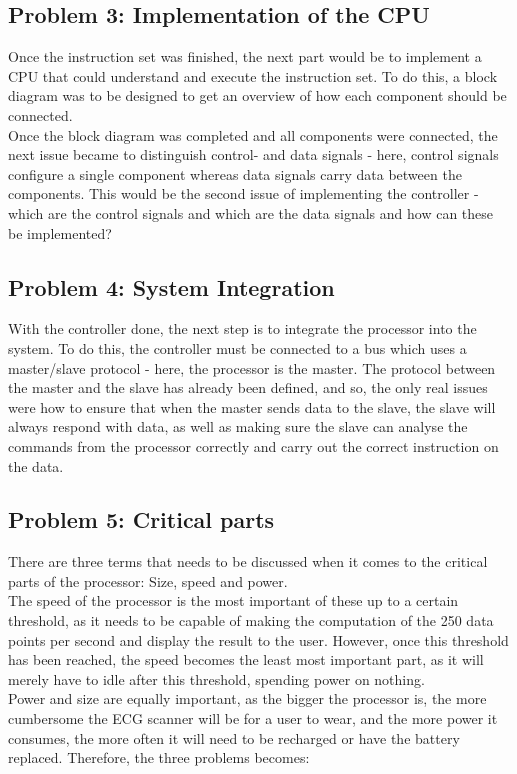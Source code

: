 \documentclass[12pt,a4paper]{article}
\begin{document}
\subsection{Problem 3: Implementation of the CPU}
	Once the instruction set was finished, the next part would be to implement a CPU that could understand and execute the instruction set. To do this, a block diagram was to be designed to get an overview of how each component should be connected.\\
	Once the block diagram was completed and all components were connected, the next issue became to distinguish control- and data signals - here, control signals configure a single component whereas data signals carry data between the components. This would be the second issue of implementing the controller - which are the control signals and which are the data signals and how can these be implemented?\\
	
\subsection{Problem 4: System Integration}
	With the controller done, the next step is to integrate the processor into the system. To do this, the controller must be connected to a bus which uses a master/slave protocol - here, the processor is the master. The protocol between the master and the slave has already been defined, and so, the only real issues were how to ensure that when the master sends data to the slave, the slave will always respond with data, as well as making sure the slave can analyse the commands from the processor correctly and carry out the correct instruction on the data.\\
	
\subsection{Problem 5: Critical parts}
	There are three terms that needs to be discussed when it comes to the critical parts of the processor: Size, speed and power.\\
	The speed of the processor is the most important of these up to a certain threshold, as it needs to be capable of making the computation of the 250 data points per second and display the result to the user. However, once this threshold has been reached, the speed becomes the least most important part, as it will merely have to idle after this threshold, spending power on nothing.\\
	Power and size are equally important, as the bigger the processor is, the more cumbersome the ECG scanner will be for a user to wear, and the more power it consumes, the more often it will need to be recharged or have the battery replaced. Therefore, the three problems becomes:
	
\end{document}
